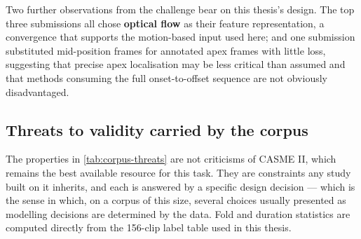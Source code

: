 Two further observations from the challenge bear on this thesis's design. The top three submissions all chose \textbf{optical flow} as their feature representation, a convergence that supports the motion-based input used here; and one submission substituted mid-position frames for annotated apex frames with little loss, suggesting that precise apex localisation may be less critical than assumed and that methods consuming the full onset-to-offset sequence are not obviously disadvantaged.

\subsection{Threats to validity carried by the corpus}
\label{sec:corpus-threats}

The properties in \autoref{tab:corpus-threats} are not criticisms of CASME II, which remains the best available resource for this task. They are constraints any study built on it inherits, and each is answered by a specific design decision --- which is the sense in which, on a corpus of this size, several choices usually presented as modelling decisions are determined by the data. Fold and duration statistics are computed directly from the 156-clip label table used in this thesis.

